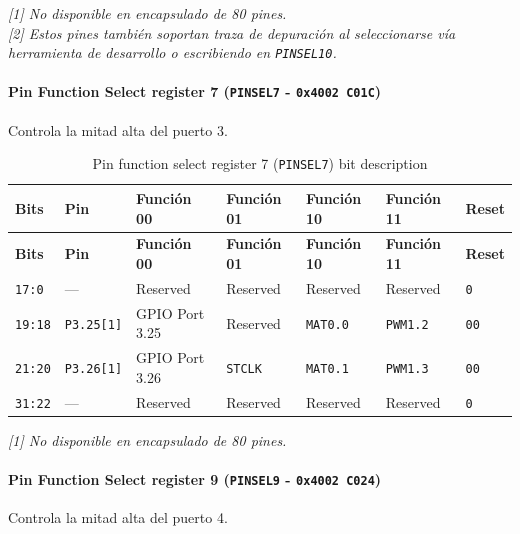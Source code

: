 \noindent\textit{[1] No disponible en encapsulado de 80 pines.}\\
\textit{[2] Estos pines también soportan traza de depuración al seleccionarse vía herramienta de desarrollo o escribiendo en \texttt{PINSEL10}.}

\paragraph{Pin Function Select register 7 (\texttt{PINSEL7} - \texttt{0x4002 C01C})}
Controla la mitad alta del puerto 3.

\begin{longtable}{|>{\raggedright\arraybackslash}p{}|>{\raggedright\arraybackslash}p{}|>{\raggedright\arraybackslash}p{}|>{\raggedright\arraybackslash}p{}|>{\raggedright\arraybackslash}p{}|>{\raggedright\arraybackslash}p{}|>{\centering\arraybackslash}p{}|}
\caption{Pin function select register 7 (\texttt{PINSEL7}) bit description}\\
\hline
\textbf{Bits} & \textbf{Pin} & \textbf{Función 00} & \textbf{Función 01} & \textbf{Función 10} & \textbf{Función 11} & \textbf{Reset} \\
\hline
\endfirsthead
\hline
\textbf{Bits} & \textbf{Pin} & \textbf{Función 00} & \textbf{Función 01} & \textbf{Función 10} & \textbf{Función 11} & \textbf{Reset} \\
\hline
\endhead
\texttt{17:0} & --- & Reserved & Reserved & Reserved & Reserved & \texttt{0} \\
\hline
\texttt{19:18} & \texttt{P3.25[1]} & GPIO Port 3.25 & Reserved & \texttt{MAT0.0} & \texttt{PWM1.2} & \texttt{00} \\
\hline
\texttt{21:20} & \texttt{P3.26[1]} & GPIO Port 3.26 & \texttt{STCLK} & \texttt{MAT0.1} & \texttt{PWM1.3} & \texttt{00} \\
\hline
\texttt{31:22} & --- & Reserved & Reserved & Reserved & Reserved & \texttt{0} \\
\hline
\end{longtable}
\noindent\textit{[1] No disponible en encapsulado de 80 pines.}

\paragraph{Pin Function Select register 9 (\texttt{PINSEL9} - \texttt{0x4002 C024})}
Controla la mitad alta del puerto 4.

